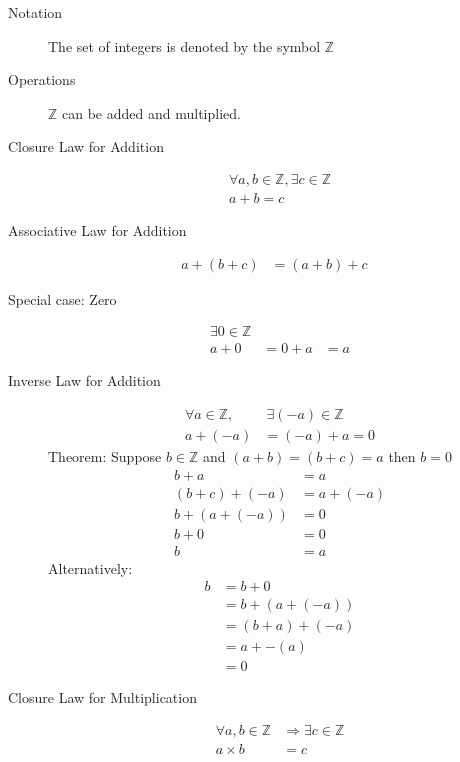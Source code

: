 \begin{description}
  \item[Notation] The set of integers is denoted by the symbol $\mathbb{Z}$
  \item[Operations] $\mathbb{Z}$ can be added and multiplied.
  \item[Closure Law for Addition]
  \begin{align}
    \forall a, b \in \mathbb{Z}, \exists c \in \mathbb{Z} \\
    a + b = c
  \end{align}
  
  \item[Associative Law for Addition]
  \begin{align}
    a + (b + c) & = (a + b) + c &
  \end{align}
  
  \item[Special case: Zero]
  \begin{align}
    \exists 0 \in \mathbb{Z} \\
    a + 0 & = 0 + a & = a
  \end{align}
  
  \item[Inverse Law for Addition]
  \begin{align}
    \forall a \in \mathbb{Z}, & ~ \exists (-a) \in \mathbb{Z} \\
    a + (-a) & = (-a) + a = 0
  \end{align}
  Theorem: Suppose $b \in \mathbb{Z}$ and $(a+b) = (b+c) = a$ then $b = 0$
  \begin{align}
             b + a & = a \\
      (b+c) + (-a) & = a + (-a) \\
    b + (a + (-a)) & = 0 \\
             b + 0 & = 0 \\
                 b & = a
  \end{align}
  Alternatively:
  \begin{align}
                 b & = b + 0 \\
                   & = b + (a+(-a)) \\
                   & = (b + a) + (-a) \\
                   & = a + -(a) \\
                   & = 0 
  \end{align} \qedbitches
  
  \item[Closure Law for Multiplication]
  \begin{align}
    \forall a, b \in \mathbb{Z} & \Rightarrow \exists c \in \mathbb{Z} \\
    a \times b & = c
  \end{align}
  

\end{description}
